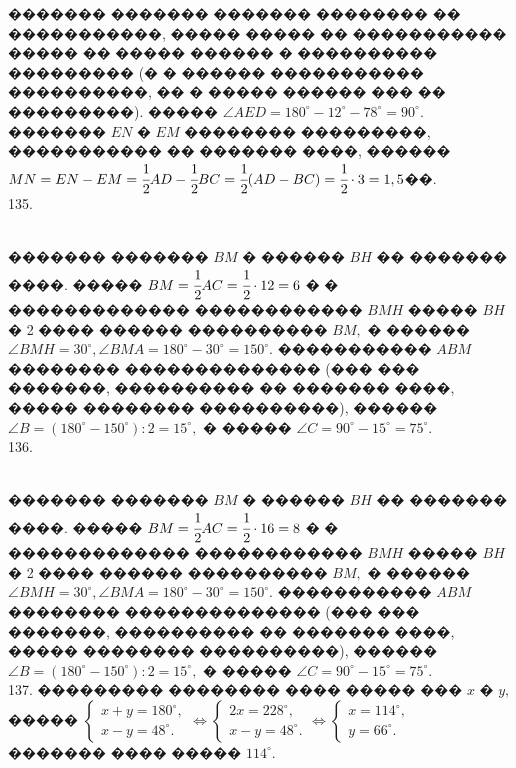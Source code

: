 \documentclass[12pt]{article}
\begin{document}
������� ������� ������� �������� �� �����������, ����� ����� �� ����������� ����� �� ����� ������ � ���������� ��������� (� � ������ ����������� ����������, �� � ����� ������ ��� �� ���������). ����� $\angle AED=180^\circ-12^\circ-78^\circ=90^\circ.$ ������� $EN$ � $EM$ �������� ���������, ����������� �� ������� ����, ������ $MN=EN-EM=\cfrac{1}{2}AD-\cfrac{1}{2}BC=\cfrac{1}{2}(AD-BC)=\cfrac{1}{2}\cdot3=1,5$��.\\
135. \begin{figure}[ht!]
\end{figure}\\
������� ������� $BM$ � ������ $BH$ �� ������� ����. ����� $BM=\cfrac{1}{2}AC=\cfrac{1}{2}\cdot12=6$ � � ������������� ������������ $BMH$ ����� $BH$ � 2 ���� ������ ���������� $BM,$ � ������ $\angle BMH=30^\circ, \angle BMA=180^\circ-30^\circ=150^\circ.$ ����������� $ABM$ �������� �������������� (��� ��� �������, ���������� �� ������� ����, ����� �������� ����������), ������ $\angle B=(180^\circ-150^\circ):2=15^\circ,$ � ����� $\angle C=90^\circ-15^\circ=75^\circ.$\\
136. \begin{figure}[ht!]
\end{figure}\\
������� ������� $BM$ � ������ $BH$ �� ������� ����. ����� $BM=\cfrac{1}{2}AC=\cfrac{1}{2}\cdot16=8$ � � ������������� ������������ $BMH$ ����� $BH$ � 2 ���� ������ ���������� $BM,$ � ������ $\angle BMH=30^\circ, \angle BMA=180^\circ-30^\circ=150^\circ.$ ����������� $ABM$ �������� �������������� (��� ��� �������, ���������� �� ������� ����, ����� �������� ����������), ������ $\angle B=(180^\circ-150^\circ):2=15^\circ,$ � ����� $\angle C=90^\circ-15^\circ=75^\circ.$\\
137. ��������� �������� ���� ����� ��� $x$ � $y,$ ����� $\begin{cases} x+y=180^\circ,\\x-y=48^\circ.\end{cases}\Leftrightarrow
\begin{cases} 2x=228^\circ,\\x-y=48^\circ.\end{cases}\Leftrightarrow\begin{cases} x=114^\circ,\\y=66^\circ.\end{cases}$\\
������� ���� ����� $114^\circ.$\\
\end{document}
